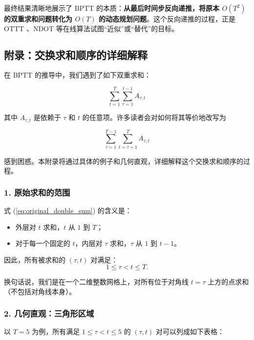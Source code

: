 \documentclass[journal,12pt,onecolumn]{IEEEtran}
\begin{document}
最终结果清晰地展示了 BPTT 的本质：\textbf{从最后时间步反向递推，将原本 \(O(T^2)\) 的双重求和问题转化为 \(O(T)\) 的动态规划问题}。这个反向递推的过程，正是 OTTT \cite{xiao_online_2022}、NDOT \cite{jiang_ndot_nodate} 等在线算法试图“近似”或“替代”的目标。

\subsection*{附录：交换求和顺序的详细解释}

在 BPTT 的推导中，我们遇到了如下双重求和：

\begin{equation}
\sum_{t=1}^T \sum_{\tau=1}^{t-1} A_{\tau,t}
\label{eq:original_double_sum}
\end{equation}

其中 \(A_{\tau,t}\) 是依赖于 \(\tau\) 和 \(t\) 的任意项。许多读者会对如何将其等价地改写为

\begin{equation}
\sum_{\tau=1}^{T-1} \sum_{t=\tau+1}^{T} A_{\tau,t}
\label{eq:swapped_double_sum}
\end{equation}

感到困惑。本附录将通过具体的例子和几何直观，详细解释这个交换求和顺序的过程。

\subsubsection*{1. 原始求和的范围}

式 (\ref{eq:original_double_sum}) 的含义是：
\begin{itemize}
    \item 外层对 \(t\) 求和，\(t\) 从 \(1\) 到 \(T\)；
    \item 对于每一个固定的 \(t\)，内层对 \(\tau\) 求和，\(\tau\) 从 \(1\) 到 \(t-1\)。
\end{itemize}

因此，所有被求和的 \((\tau, t)\) 对满足：
\begin{equation}
1 \le \tau < t \le T.
\end{equation}

换句话说，我们是在一个二维整数网格上，对所有位于对角线 \(t = \tau\) 上方的点求和（不包括对角线本身）。

\subsubsection*{2. 几何直观：三角形区域}

以 \(T=5\) 为例，所有满足 \(1 \le \tau < t \le 5\) 的 \((\tau, t)\) 对可以列成如下表格：
\end{document}
